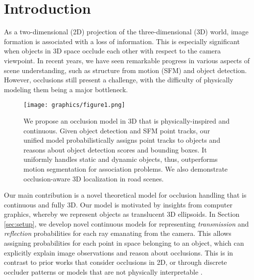 \section{Introduction}


As a two-dimensional (2D) projection of the three-dimensional (3D) world, image formation is associated with a loss of information. This is especially significant when objects in 3D space occlude each other with respect to the camera viewpoint. In recent years, we have seen remarkable progress in various aspects of scene understanding, such as structure from motion (SFM) and object detection. However, occlusions still present a challenge, with the difficulty of physically modeling them being a major bottleneck. 

\begin{figure}[!!t]
\begin{center}
\texttt{[image: graphics/figure1.png]}
\end{center}
\vspace{-0.6cm}
\caption{\small We propose an occlusion model in 3D that is physically-inspired and continuous. Given object detection and SFM point tracks, our unified model probabilistically assigns point tracks to objects and reasons about object detection scores and bounding boxes. It uniformly handles static and dynamic objects, thus, outperforms motion segmentation for association problems. We also demonstrate occlusion-aware 3D localization in road scenes.}
\label{fig:page1}
\vspace{-0.4cm}
\end{figure}

Our main contribution is a novel theoretical model for occlusion handling that is continuous and fully 3D. Our model is motivated by insights from computer graphics, whereby we represent objects as translucent 3D ellipsoids. In Section \ref{sec:setup}, we develop novel continuous models for representing \emph{transmission} and \emph{reflection} probabilities for each ray emanating from the camera. This allows assigning probabilities for each point in space belonging to an object, which can explicitly explain image observations and reason about occlusions. This is in contrast to prior works that consider occlusions in 2D, or through discrete occluder patterns or models that are not physically interpretable \cite{Pepik_etal_2012,Pepik_etal_2013,Xiang_Savarese_2013,Zia_etal_2013,Zia_etal_2014,Zia2015}.



